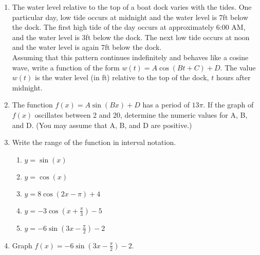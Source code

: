 \begin{enumerate}
\newpage
\item The water level relative to the top of a boat dock varies with the tides.  One particular day, low tide occurs at midnight and the water level is 7ft below the dock.  The first high tide of the day occurs at approximately 6:00 AM, and the water level is 3ft below the dock.  The next low tide occurs at noon and the water level is again 7ft below the dock.\\
Assuming that this pattern continues indefinitely and behaves like a cosine wave, write a function of the form $w(t)=A\cos(Bt+C)+D$.  The value $w(t)$ is the water level (in ft) relative to the top of the dock, $t$ hours after midnight.

\newpage

\item The function $f(x)=A\sin(Bx)+D$ has a period of $13\pi$.  If the graph of $f(x)$ oscillates between 2 and 20, determine the numeric values for A, B, and D.  (You may assume that A, B, and D are positive.)
\vfill
\vfill

\item Write the range of the function in interval notation.
\begin{enumerate}
\item $y=\sin(x)$\\[0.2in]
\item $y=\cos(x)$\\[0.2in]
\item $y=8\cos(2x-\pi)+4$\vfill
\item $y=-3\cos(x+\frac{\pi}{3})-5$\vfill
\item $y=-6\sin(3x-\frac{\pi}{2})-2$\vfill
\end{enumerate}

\newpage
\item Graph $f(x)=-6\sin(3x-\frac{\pi}{2})-2$.






\end{enumerate}

